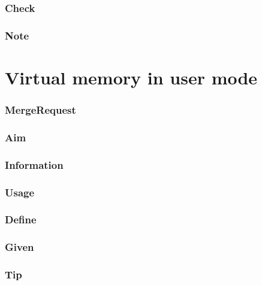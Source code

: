 \documentclass[]{book}
\begin{document}
\subsubsection*{Check}\label{check-16}

\subsubsection*{Note}\label{note-18}

\section{Virtual memory in user mode}\label{virtual-memory-in-user-mode}

\subsubsection*{MergeRequest}\label{mergerequest-18}

\subsubsection*{Aim}\label{aim-18}

\subsubsection*{Information}\label{information-17}

\subsubsection*{Usage}\label{usage-17}

\subsubsection*{Define}\label{define-17}

\subsubsection*{Given}\label{given-17}

\subsubsection*{Tip}\label{tip-17}
\end{document}
